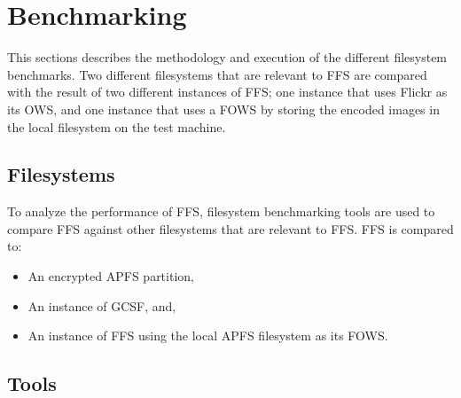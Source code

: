 \section{Benchmarking}
This sections describes the methodology and execution of the different filesystem benchmarks. Two different filesystems that are relevant to FFS are compared with the result of two different instances of FFS; one instance that uses Flickr as its OWS, and one instance that uses a FOWS by storing the encoded images in the local filesystem on the test machine.

\subsection{Filesystems}
To analyze the performance of FFS, filesystem benchmarking tools are used to compare FFS against other filesystems that are relevant to FFS. FFS is compared to:
\begin{itemize}
	\item An encrypted APFS partition,
	\item An instance of GCSF, and,
	\item An instance of FFS using the local APFS filesystem as its FOWS.
\end{itemize}


\subsection{Tools}